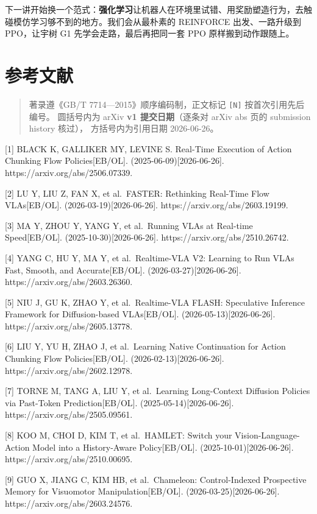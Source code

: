 \documentclass[
  chinese,
]{ctexart}
\begin{document}
下一讲开始换一个范式：\textbf{强化学习}让机器人在环境里试错、用奖励塑造行为，去触碰模仿学习够不到的地方。我们会从最朴素的
REINFORCE 出发、一路升级到 PPO，让宇树 G1 先学会走路，最后再把同一套 PPO
原样搬到动作跟随上。

\section{参考文献}\label{ux53c2ux8003ux6587ux732e}

\begin{quote}
著录遵《GB/T 7714---2015》顺序编码制，正文标记 \texttt{{[}N{]}}
按首次引用先后编号。 圆括号内为 arXiv \textbf{v1 提交日期}（逐条对 arXiv
abs 页的 submission history 核过）， 方括号内为引用日期 2026-06-26。
\end{quote}

{[}1{]} BLACK K, GALLIKER MY, LEVINE S. Real-Time Execution of Action
Chunking Flow Policies{[}EB/OL{]}. (2025-06-09){[}2026-06-26{]}.
https://arxiv.org/abs/2506.07339.

{[}2{]} LU Y, LIU Z, FAN X, et al.~FASTER: Rethinking Real-Time Flow
VLAs{[}EB/OL{]}. (2026-03-19){[}2026-06-26{]}.
https://arxiv.org/abs/2603.19199.

{[}3{]} MA Y, ZHOU Y, YANG Y, et al.~Running VLAs at Real-time
Speed{[}EB/OL{]}. (2025-10-30){[}2026-06-26{]}.
https://arxiv.org/abs/2510.26742.

{[}4{]} YANG C, HU Y, MA Y, et al.~Realtime-VLA V2: Learning to Run VLAs
Fast, Smooth, and Accurate{[}EB/OL{]}. (2026-03-27){[}2026-06-26{]}.
https://arxiv.org/abs/2603.26360.

{[}5{]} NIU J, GU K, ZHAO Y, et al.~Realtime-VLA FLASH: Speculative
Inference Framework for Diffusion-based VLAs{[}EB/OL{]}.
(2026-05-13){[}2026-06-26{]}. https://arxiv.org/abs/2605.13778.

{[}6{]} LIU Y, YU H, ZHAO J, et al.~Learning Native Continuation for
Action Chunking Flow Policies{[}EB/OL{]}. (2026-02-13){[}2026-06-26{]}.
https://arxiv.org/abs/2602.12978.

{[}7{]} TORNE M, TANG A, LIU Y, et al.~Learning Long-Context Diffusion
Policies via Past-Token Prediction{[}EB/OL{]}.
(2025-05-14){[}2026-06-26{]}. https://arxiv.org/abs/2505.09561.

{[}8{]} KOO M, CHOI D, KIM T, et al.~HAMLET: Switch your
Vision-Language-Action Model into a History-Aware Policy{[}EB/OL{]}.
(2025-10-01){[}2026-06-26{]}. https://arxiv.org/abs/2510.00695.

{[}9{]} GUO X, JIANG C, KIM HB, et al.~Chameleon: Control-Indexed
Prospective Memory for Visuomotor Manipulation{[}EB/OL{]}.
(2026-03-25){[}2026-06-26{]}. https://arxiv.org/abs/2603.24576.
\end{document}
